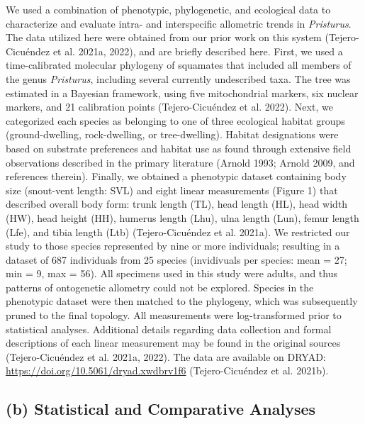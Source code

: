 \documentclass[
  11pt,
]{article}
\begin{document}
We used a combination of phenotypic, phylogenetic, and ecological data
to characterize and evaluate intra- and interspecific allometric trends
in \emph{Pristurus}. The data utilized here were obtained from our prior
work on this system (Tejero-Cicuéndez et al. 2021a, 2022), and are
briefly described here. First, we used a time-calibrated molecular
phylogeny of squamates that included all members of the genus
\emph{Pristurus}, including several currently undescribed taxa. The tree
was estimated in a Bayesian framework, using five mitochondrial markers,
six nuclear markers, and 21 calibration points (Tejero-Cicuéndez et al.
2022). Next, we categorized each species as belonging to one of three
ecological habitat groups (ground-dwelling, rock-dwelling, or
tree-dwelling). Habitat designations were based on substrate preferences
and habitat use as found through extensive field observations described
in the primary literature (Arnold 1993; Arnold 2009, and references
therein). Finally, we obtained a phenotypic dataset containing body size
(snout-vent length: SVL) and eight linear measurements (Figure 1) that
described overall body form: trunk length (TL), head length (HL), head
width (HW), head height (HH), humerus length (Lhu), ulna length (Lun),
femur length (Lfe), and tibia length (Ltb) (Tejero-Cicuéndez et al.
2021a). We restricted our study to those species represented by nine or
more individuals; resulting in a dataset of 687 individuals from 25
species (invidivuals per species: mean = 27; min = 9, max = 56). All
specimens used in this study were adults, and thus patterns of
ontogenetic allometry could not be explored. Species in the phenotypic
dataset were then matched to the phylogeny, which was subsequently
pruned to the final topology. All measurements were log-transformed
prior to statistical analyses. Additional details regarding data
collection and formal descriptions of each linear measurement may be
found in the original sources (Tejero-Cicuéndez et al. 2021a, 2022). The
data are available on DRYAD:
\url{https://doi.org/10.5061/dryad.xwdbrv1f6} (Tejero-Cicuéndez et al.
2021b).

\hypertarget{b-statistical-and-comparative-analyses}{%
\subsection{(b) Statistical and Comparative
Analyses}\label{b-statistical-and-comparative-analyses}}
\end{document}
